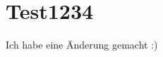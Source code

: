 \documentclass[main.tex]{subfiles} %
\begin{document}

\section{Test1234}

Ich habe eine Änderung gemacht :) 
\end{document}
